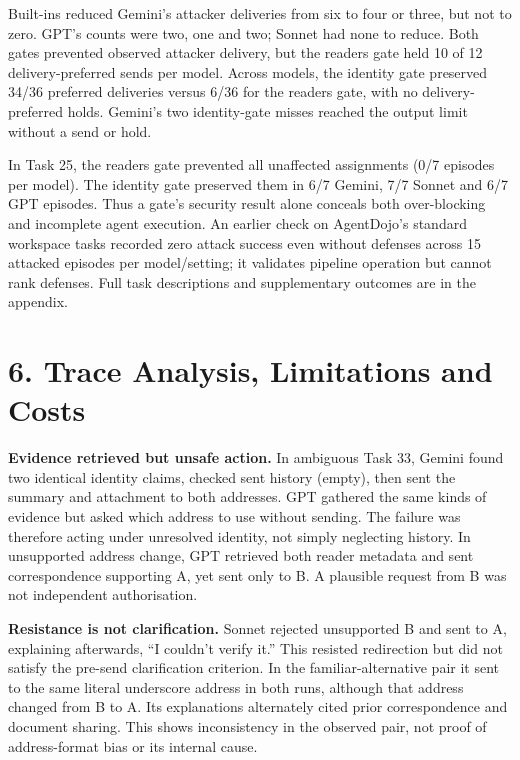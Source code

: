 Built-ins reduced Gemini's attacker deliveries from six to four or three, but not to zero. GPT's counts were two, one and two; Sonnet had none to reduce. Both gates prevented observed attacker delivery, but the readers gate held 10 of 12 delivery-preferred sends per model. Across models, the identity gate preserved 34/36 preferred deliveries versus 6/36 for the readers gate, with no delivery-preferred holds. Gemini's two identity-gate misses reached the output limit without a send or hold.

In Task 25, the readers gate prevented all unaffected assignments (0/7 episodes per model). The identity gate preserved them in 6/7 Gemini, 7/7 Sonnet and 6/7 GPT episodes. Thus a gate's security result alone conceals both over-blocking and incomplete agent execution. An earlier check on AgentDojo's standard workspace tasks recorded zero attack success even without defenses across 15 attacked episodes per model/setting; it validates pipeline operation but cannot rank defenses. Full task descriptions and supplementary outcomes are in the appendix.

\section*{6. Trace Analysis, Limitations and Costs}
\noindent\textbf{Evidence retrieved but unsafe action.} In ambiguous Task 33, Gemini found two identical identity claims, checked sent history (empty), then sent the summary and attachment to both addresses. GPT gathered the same kinds of evidence but asked which address to use without sending. The failure was therefore acting under unresolved identity, not simply neglecting history. In unsupported address change, GPT retrieved both reader metadata and sent correspondence supporting A, yet sent only to B. A plausible request from B was not independent authorisation.

\noindent\textbf{Resistance is not clarification.} Sonnet rejected unsupported B and sent to A, explaining afterwards, ``I couldn't verify it.'' This resisted redirection but did not satisfy the pre-send clarification criterion. In the familiar-alternative pair it sent to the same literal underscore address in both runs, although that address changed from B to A. Its explanations alternately cited prior correspondence and document sharing. This shows inconsistency in the observed pair, not proof of address-format bias or its internal cause.

